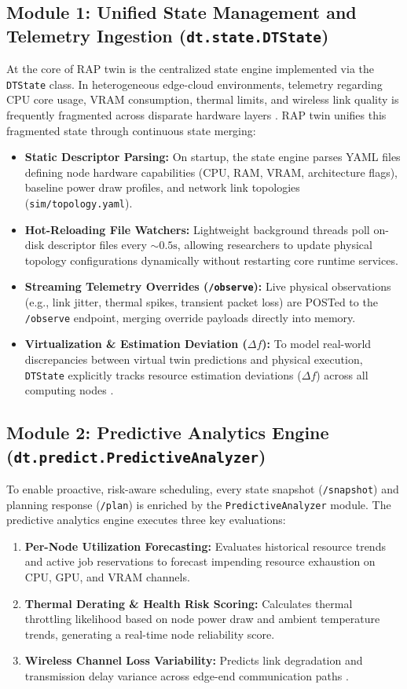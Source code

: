 \documentclass[twoside,twocolumn,10pt]{article}
\begin{document}
\subsection{Module 1: Unified State Management and Telemetry Ingestion (\texttt{dt.state.DTState})}
At the core of RAP twin is the centralized state engine implemented via the \texttt{DTState} class. In heterogeneous edge-cloud environments, telemetry regarding CPU core usage, VRAM consumption, thermal limits, and wireless link quality is frequently fragmented across disparate hardware layers \cite{qi2019, fuller2020}. RAP twin unifies this fragmented state through continuous state merging:

\begin{itemize}
    \item \textbf{Static Descriptor Parsing:} On startup, the state engine parses YAML files defining node hardware capabilities (CPU, RAM, VRAM, architecture flags), baseline power draw profiles, and network link topologies (\texttt{sim/topology.yaml}).
    \item \textbf{Hot-Reloading File Watchers:} Lightweight background threads poll on-disk descriptor files every $\sim 0.5\text{s}$, allowing researchers to update physical topology configurations dynamically without restarting core runtime services.
    \item \textbf{Streaming Telemetry Overrides (\texttt{/observe}):} Live physical observations (e.g., link jitter, thermal spikes, transient packet loss) are POSTed to the \texttt{/observe} endpoint, merging override payloads directly into memory.
    \item \textbf{Virtualization \& Estimation Deviation ($\Delta f$):} To model real-world discrepancies between virtual twin predictions and physical execution, \texttt{DTState} explicitly tracks resource estimation deviations ($\Delta f$) across all computing nodes \cite{xu2023}.
\end{itemize}

\subsection{Module 2: Predictive Analytics Engine (\texttt{dt.predict.PredictiveAnalyzer})}
To enable proactive, risk-aware scheduling, every state snapshot (\texttt{/snapshot}) and planning response (\texttt{/plan}) is enriched by the \texttt{PredictiveAnalyzer} module. The predictive analytics engine executes three key evaluations:
\begin{enumerate}
    \item \textbf{Per-Node Utilization Forecasting:} Evaluates historical resource trends and active job reservations to forecast impending resource exhaustion on CPU, GPU, and VRAM channels.
    \item \textbf{Thermal Derating \& Health Risk Scoring:} Calculates thermal throttling likelihood based on node power draw and ambient temperature trends, generating a real-time node reliability score.
    \item \textbf{Wireless Channel Loss Variability:} Predicts link degradation and transmission delay variance across edge-end communication paths \cite{dai2024}.
\end{enumerate}
\end{document}
